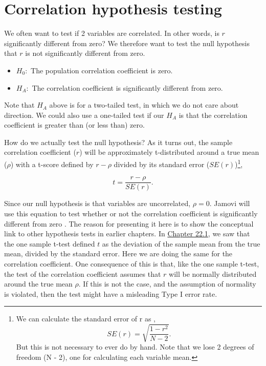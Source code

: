 \documentclass[
  openany]{scrbook}
\providecommand{\tightlist}{%
  \setlength{\itemsep}{0pt}\setlength{\parskip}{0pt}}
\begin{document}
\hypertarget{correlation-hypothesis-testing}{%
\section{Correlation hypothesis testing}\label{correlation-hypothesis-testing}}

We often want to test if 2 variables are correlated.
In other words, is \(r\) significantly different from zero?
We therefore want to test the null hypothesis that \(r\) is not significantly different from zero.

\begin{itemize}
\tightlist
\item
  \(H_{0}:\) The population correlation coefficient is zero.
\item
  \(H_{A}:\) The correlation coefficient is significantly different from zero.
\end{itemize}

Note that \(H_{A}\) above is for a two-tailed test, in which we do not care about direction.
We could also use a one-tailed test if our \(H_{A}\) is that the correlation coefficient is greater than (or less than) zero.

How do we actually test the null hypothesis?
As it turns out, the sample correlation coefficient (\(r\)) will be approximately t-distributed around a true mean (\(\rho\)) with a t-score defined by \(r - \rho\) divided by its standard error (\(SE(r)\))\footnote{We can calculate the standard error of r as \citep{Rahman1968}, \[SE(r) = \sqrt{\frac{1 - r^{2}}{N - 2}}.\] But this is not necessary to ever do by hand. Note that we lose 2 degrees of freedom (N - 2), one for calculating each variable mean.},

\[t = \frac{r - \rho}{SE(r)}.\]

Since our null hypothesis is that variables are uncorrelated, \(\rho = 0\).
Jamovi will use this equation to test whether or not the correlation coefficient is significantly different from zero \citep{Jamovi2022}.
The reason for presenting it here is to show the conceptual link to other hypothesis tests in earlier chapters.
In \protect\hyperlink{one-sample-t-test}{Chapter 22.1}, we saw that the one sample t-test defined \(t\) as the deviation of the sample mean from the true mean, divided by the standard error.
Here we are doing the same for the correlation coefficient.
One consequence of this is that, like the one sample t-test, the test of the correlation coefficient assumes that \(r\) will be normally distributed around the true mean \(\rho\).
If this is not the case, and the assumption of normality is violated, then the test might have a misleading Type I error rate.
\end{document}
